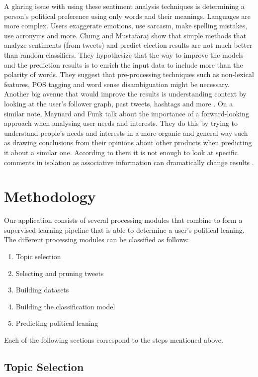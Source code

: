 \documentclass[letterpaper]{article} %
\begin{document}
A glaring issue with using these sentiment analysis techniques is determining a person’s political preference using only words and their meanings. Languages are more complex. Users exaggerate emotions, use sarcasm, make spelling mistakes, use acronyms and more. Chung and Mustafaraj show that simple methods that analyze sentiments (from tweets) and predict election results are not much better than random classifiers. They hypothesize that the way to improve the models and the prediction results is to enrich the input data to include more than the polarity of words. They suggest that pre-processing techniques such as non-lexical features, POS tagging and word sense disambiguation might be necessary. Another big avenue that would improve the results is understanding context by looking at the user’s follower graph, past tweets, hashtags and more \cite{chungCan}. On a similar note, Maynard and Funk talk about the importance of a forward-looking approach when analysing user needs and interests. They do this by trying to understand people’s needs and interests in a more organic and general way such as drawing conclusions from their opinions about other products when predicting it about a similar one. According to them it is not enough to look at specific comments in isolation as associative information can dramatically change results \cite{maynardAutomatic}.


\section{Methodology}

Our application consists of several processing modules that combine to form a supervised learning pipeline that is able to determine a user’s political leaning. The different processing modules can be classified as follows:

\begin{enumerate}
	\item Topic selection
	\item Selecting and pruning tweets
	\item Building datasets
	\item Building the classification model
	\item Predicting political leaning
\end{enumerate}
Each of the following sections correspond to the steps mentioned above.

\subsection{Topic Selection}
\end{document}
